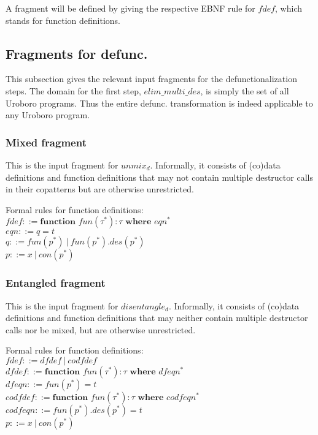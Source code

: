 \documentclass[11pt]{article} %
\begin{document}
A fragment will be defined by giving the respective EBNF rule for $fdef$, which stands for function definitions.

\subsection{Fragments for defunc.}

This subsection gives the relevant input fragments for the defunctionalization steps. The domain for the first step, $elim\_multi\_des$, is simply the set of all Uroboro programs. Thus the entire defunc. transformation is indeed applicable to any Uroboro program.

\subsubsection{Mixed fragment}

This is the input fragment for $unmix_d$. Informally, it consists of (co)data definitions and function definitions that may not contain multiple destructor calls in their copatterns but are otherwise unrestricted. 

Formal rules for function definitions:\\
$fdef ::= \textbf{function } fun(\tau^*): \tau \textbf{ where } eqn^*$\\
$eqn ::= q = t$\\
$q ::= fun(p^*) ~ | ~ fun(p^*).des(p^*)$\\
$p ::= x ~ | ~ con(p^*) $\\

\subsubsection{Entangled fragment}

This is the input fragment for $disentangle_d$. Informally, it consists of (co)data definitions and function definitions that may neither contain multiple destructor calls nor be mixed, but are otherwise unrestricted.

Formal rules for function definitions:\\
$fdef ::= dfdef ~ | ~ codfdef$\\
$dfdef ::= \textbf{function } fun(\tau^*): \tau \textbf{ where } dfeqn^*$\\
$dfeqn ::= fun(p^*) = t$\\
$codfdef ::= \textbf{function } fun(\tau^*): \tau \textbf{ where } codfeqn^*$\\
$codfeqn ::= fun(p^*).des(p^*) = t$\\
$p ::= x ~ | ~ con(p^*) $\\
\end{document}
